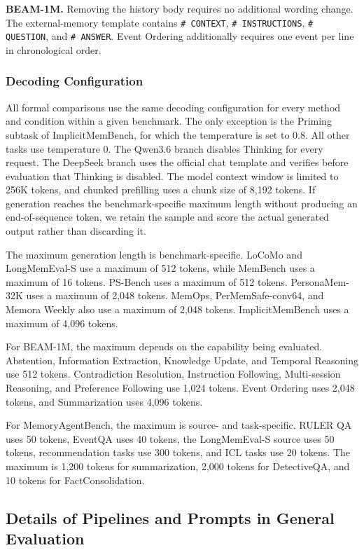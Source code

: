 \noindent\textbf{BEAM-1M.}
Removing the history body requires no additional wording change. The external-memory template contains \texttt{\# CONTEXT},
\texttt{\# INSTRUCTIONS}, \texttt{\# QUESTION}, and \texttt{\# ANSWER}.
Event Ordering additionally requires one event per line in chronological order.


\subsubsection{Decoding Configuration}
\label{appendix:memory_decoding_configuration}

All formal comparisons use the same decoding configuration for every method and condition within a given benchmark.
The only exception is the Priming subtask of ImplicitMemBench, for which the temperature is set to $0.8$.
All other tasks use temperature $0$.
The Qwen3.6 branch disables Thinking for every request. The DeepSeek branch uses the official chat template and verifies before evaluation that Thinking is disabled. The model context window is limited to 256K tokens, and chunked prefilling uses a chunk size of 8,192 tokens.
If generation reaches the benchmark-specific maximum length without producing an end-of-sequence token, we retain the sample and score the actual generated output rather than discarding it.

The maximum generation length is benchmark-specific. LoCoMo and LongMemEval-S use a maximum of 512 tokens, while MemBench uses a maximum of 16 tokens. PS-Bench uses a maximum of 512 tokens. PersonaMem-32K uses a maximum of 2,048 tokens.
MemOps, PerMemSafe-conv64, and Memora Weekly also use a maximum of 2,048 tokens.
ImplicitMemBench uses a maximum of 4,096 tokens.

For BEAM-1M, the maximum depends on the capability being evaluated. Abstention, Information Extraction, Knowledge Update, and Temporal Reasoning use 512 tokens.
Contradiction Resolution, Instruction Following, Multi-session Reasoning, and Preference Following use 1,024 tokens. Event Ordering uses 2,048 tokens, and Summarization uses 4,096 tokens.

For MemoryAgentBench, the maximum is source- and task-specific. RULER QA uses 50 tokens, EventQA uses 40 tokens, the LongMemEval-S source uses 50 tokens, recommendation tasks use 300 tokens, and ICL tasks use 20 tokens. The maximum is 1,200 tokens for summarization, 2,000 tokens for DetectiveQA, and 10 tokens for
FactConsolidation.


\subsection{Details of Pipelines and Prompts in General Evaluation}
\label{appendix:eval_general_pipeline_details}

